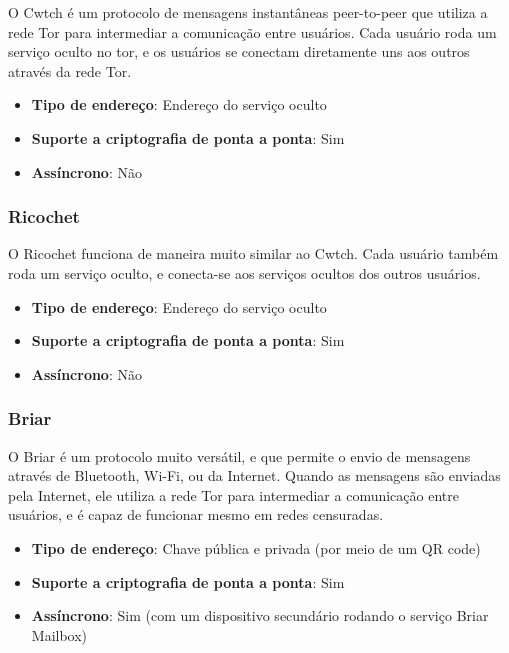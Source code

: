 O Cwtch é um protocolo de mensagens instantâneas peer-to-peer que utiliza a rede Tor para intermediar a comunicação entre usuários. Cada usuário roda um serviço oculto no tor, e os usuários se conectam diretamente uns aos outros através da rede Tor. \cite{cwtch}

\begin{itemize}
  \item \textbf{Tipo de endereço}: Endereço do serviço oculto
  \item \textbf{Suporte a criptografia de ponta a ponta}: Sim
  \item \textbf{Assíncrono}: Não
\end{itemize}

\subsubsection{Ricochet}

O Ricochet funciona de maneira muito similar ao Cwtch. Cada usuário também roda um serviço oculto, e conecta-se aos serviços ocultos dos outros usuários. \cite{ricochet}

\begin{itemize}
  \item \textbf{Tipo de endereço}: Endereço do serviço oculto
  \item \textbf{Suporte a criptografia de ponta a ponta}: Sim
  \item \textbf{Assíncrono}: Não
\end{itemize}

\subsubsection{Briar}

O Briar é um protocolo muito versátil, e que permite o envio de mensagens através de Bluetooth, Wi-Fi, ou da Internet. Quando as mensagens são enviadas pela Internet, ele utiliza a rede Tor para intermediar a comunicação entre usuários, e é capaz de funcionar mesmo em redes censuradas. \cite{briar}

\begin{itemize}
  \item \textbf{Tipo de endereço}: Chave pública e privada (por meio de um QR code)
  \item \textbf{Suporte a criptografia de ponta a ponta}: Sim
  \item \textbf{Assíncrono}: Sim (com um dispositivo secundário rodando o serviço Briar Mailbox)
\end{itemize}

